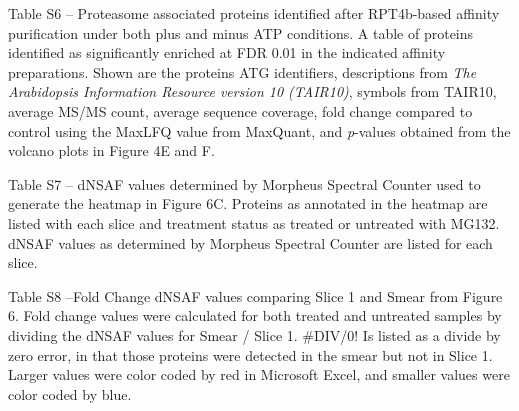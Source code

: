 Table S6 – Proteasome associated proteins identified after RPT4b-based affinity purification under both plus and minus ATP conditions. A table of proteins identified as significantly enriched at FDR 0.01 in the indicated affinity preparations.  Shown are the proteins ATG identifiers, descriptions from \textit{The Arabidopsis Information Resource version 10 (TAIR10)}, symbols from TAIR10, average MS/MS count, average sequence coverage, fold change compared to control using the MaxLFQ value from MaxQuant, and \textit{p}-values obtained from the volcano plots in Figure 4E and F.

Table S7 – dNSAF values determined by Morpheus Spectral Counter used to generate the heatmap in Figure 6C. Proteins as annotated in the heatmap are listed with each slice and treatment status as treated or untreated with MG132. dNSAF values as determined by Morpheus Spectral Counter \citep{gemperline16} are listed for each slice.

Table S8 –Fold Change dNSAF values comparing Slice 1 and Smear from Figure 6. Fold change values were calculated for both treated and untreated samples by dividing the dNSAF values for Smear / Slice 1. \#DIV/0! Is listed as a divide by zero error, in that those proteins were detected in the smear but not in Slice 1. Larger values were color coded by red in Microsoft Excel, and smaller values were color coded by blue.
